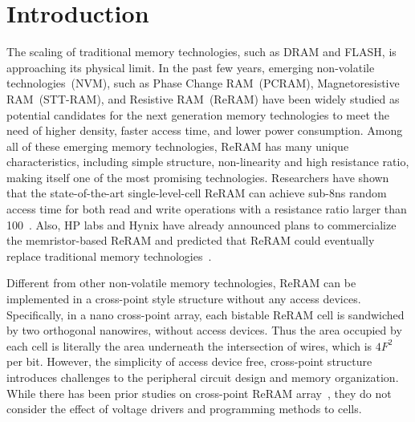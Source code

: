 \section{Introduction}\label{sec:intro}
The scaling of traditional memory technologies, such as %
DRAM and FLASH, is approaching its %
physical limit.
In the past few years, emerging non-volatile technologies~(NVM), such as Phase Change RAM~(PCRAM), Magnetoresistive RAM~(STT-RAM), and Resistive RAM~(ReRAM) have been widely studied as potential candidates for the next generation memory technologies to meet the need of higher density, faster access time, and lower power consumption. Among all of these emerging memory technologies, ReRAM has many unique characteristics, including simple structure, non-linearity and high resistance ratio, making itself one of the most promising technologies. Researchers have shown that the state-of-the-art single-level-cell ReRAM can achieve sub-8ns random access time for both read and write operations with a resistance ratio larger than 100~\cite{ReRAM_ISSCC2011_Sheu}. Also, HP labs and Hynix have already announced plans to commercialize the memristor-based ReRAM and predicted that ReRAM could eventually replace traditional memory technologies~\cite{memristor:HpHynix}.

Different from other non-volatile memory technologies, ReRAM can be implemented in a cross-point style structure without any access devices. Specifically, in a nano cross-point array, each bistable ReRAM cell is sandwiched by two orthogonal nanowires, without access devices. Thus the area occupied by each cell is literally the area underneath the intersection of wires, which is $4F^2$ per bit.
However, the simplicity of access device free, cross-point structure introduces challenges to the peripheral circuit design and memory organization.
While there has been prior studies on cross-point ReRAM array~\cite{crossbar_NANO2002_Ziegler,crossbar_NANO08_Flocke,crossbar_TED_2010,crossbar_NANO2003_Ziegler}, they do not consider the effect of voltage drivers and programming methods to cells.

